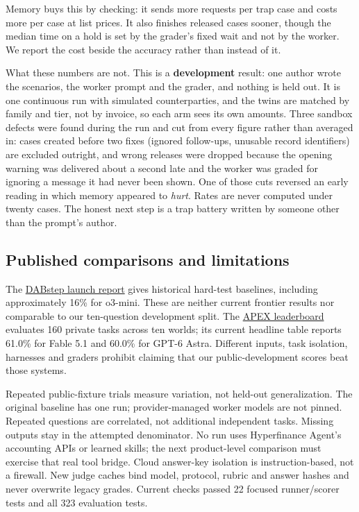 \documentclass[11pt]{article}
\begin{document}
Memory buys this by checking: it sends more requests per trap case and costs more per case at list prices. It also finishes released cases sooner, though the median time on a hold is set by the grader's fixed wait and not by the worker. We report the cost beside the accuracy rather than instead of it.

What these numbers are not. This is a \textbf{development} result: one author wrote the scenarios, the worker prompt and the grader, and nothing is held out. It is one continuous run with simulated counterparties, and the twins are matched by family and tier, not by invoice, so each arm sees its own amounts. Three sandbox defects were found during the run and cut from every figure rather than averaged in: cases created before two fixes (ignored follow-ups, unusable record identifiers) are excluded outright, and \liveexcluded{} wrong releases were dropped because the opening warning was delivered about a second late and the worker was graded for ignoring a message it had never been shown. One of those cuts reversed an early reading in which memory appeared to \emph{hurt}. Rates are never computed under twenty cases. The honest next step is a trap battery written by someone other than the prompt's author.

\subsection{Published comparisons and limitations}

The \href{https://huggingface.co/blog/dabstep}{DABstep launch report} gives historical hard-test baselines, including approximately 16\% for o3-mini. These are neither current frontier results nor comparable to our ten-question development split. The \href{https://www.mercor.com/apex/apex-accounting-leaderboard/}{APEX leaderboard} evaluates 160 private tasks across ten worlds; its current headline table reports 61.0\% for Fable 5.1 and 60.0\% for GPT-6 Astra. Different inputs, task isolation, harnesses and graders prohibit claiming that our public-development scores beat those systems.

Repeated public-fixture trials measure variation, not held-out generalization. The original baseline has one run; provider-managed worker models are not pinned. Repeated questions are correlated, not additional independent tasks. Missing outputs stay in the attempted denominator. No run uses Hyperfinance Agent's accounting APIs or learned skills; the next product-level comparison must exercise that real tool bridge. Cloud answer-key isolation is instruction-based, not a firewall. New judge caches bind model, protocol, rubric and answer hashes and never overwrite legacy grades. Current checks passed 22 focused runner/scorer tests and all 323 evaluation tests.
\end{document}
